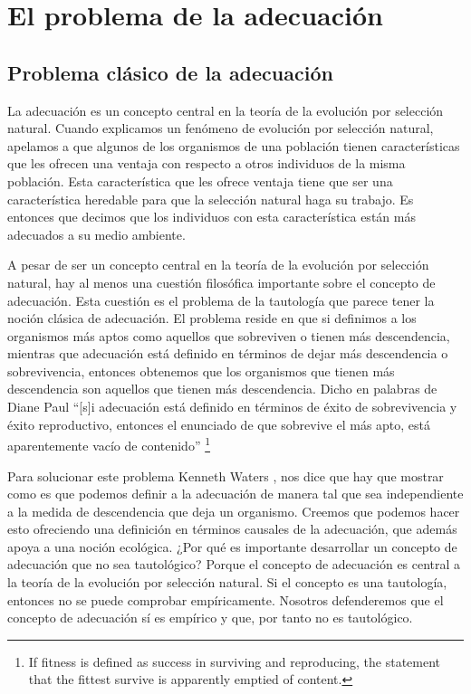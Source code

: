 
\chapter{El problema de la adecuación}

\section{Problema clásico de la adecuación}

\noindent La adecuación es un concepto central en la teoría de la evolución por selección natural. Cuando explicamos un fenómeno de evolución por selección natural, apelamos a que algunos de los organismos de una población tienen características que les ofrecen una ventaja con respecto a otros individuos de la misma población. Esta característica que les ofrece ventaja tiene que ser una característica heredable para que la selección natural haga su trabajo. Es entonces que decimos que los individuos con esta característica están más adecuados a su medio ambiente.

A pesar de ser un concepto central en la teoría de la evolución por selección natural, hay al menos una cuestión filosófica importante sobre el concepto de adecuación. Esta cuestión es el problema de la tautología que parece tener la noción clásica de adecuación. El problema reside en que si definimos a los organismos más aptos como aquellos que sobreviven o tienen más descendencia, mientras que adecuación está definido en términos de dejar más descendencia o sobrevivencia, entonces obtenemos que los organismos que tienen más descendencia son aquellos que tienen más descendencia. Dicho en palabras de Diane Paul ``[s]i adecuación está definido en términos de éxito de sobrevivencia y éxito reproductivo, entonces el enunciado de que sobrevive el más apto, está aparentemente vacío de contenido'' \footnote{If fitness is defined as success in surviving and reproducing, the statement that the fittest survive is apparently emptied of content.} \citeyear{Paul1992}

Para solucionar este problema Kenneth Waters \citeyear{Waters1986}, nos dice que hay que mostrar como es que podemos definir a la adecuación de manera tal que sea independiente a la medida de descendencia que deja un organismo. Creemos que podemos hacer esto ofreciendo una definición en términos causales de la adecuación, que además apoya a una noción ecológica. ¿Por qué es importante desarrollar un concepto de adecuación que no sea tautológico? Porque el concepto de adecuación es central a la teoría de la evolución por selección natural. Si el concepto es una tautología, entonces no se puede comprobar empíricamente. Nosotros defenderemos que el concepto de adecuación sí es empírico y que, por tanto no es tautológico.

